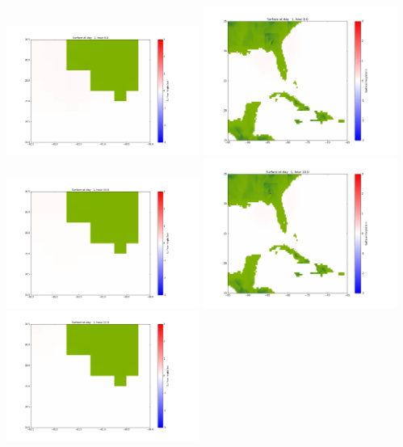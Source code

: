 \documentclass[11pt]{article}
\begin{document}
\vskip 10pt 
\includegraphics[width=0.475\textwidth]{frame0040fig1001.png}
\includegraphics[width=0.475\textwidth]{frame0040fig1002.png}
\vskip 10pt 
\includegraphics[width=0.475\textwidth]{frame0041fig1001.png}
\includegraphics[width=0.475\textwidth]{frame0041fig1002.png}
\vskip 10pt 
\includegraphics[width=0.475\textwidth]{frame0042fig1001.png}
\end{document}
